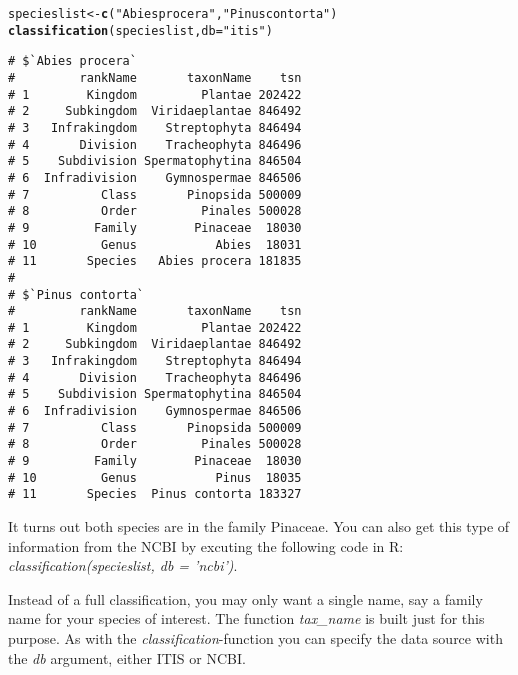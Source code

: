 \documentclass[10pt,a4paper,twocolumn]{article}\usepackage[]{graphicx}\usepackage[]{color}
\makeatletter
\newcommand{\hlstr}[1]{\textcolor[rgb]{0.192,0.494,0.8}{#1}}%
\newcommand{\hlstd}[1]{\textcolor[rgb]{0.345,0.345,0.345}{#1}}%
\newcommand{\hlkwb}[1]{\textcolor[rgb]{0.69,0.353,0.396}{#1}}%
\newcommand{\hlkwc}[1]{\textcolor[rgb]{0.333,0.667,0.333}{#1}}%
\newcommand{\hlkwd}[1]{\textcolor[rgb]{0.737,0.353,0.396}{\textbf{#1}}}%
\newenvironment{kframe}{%
 \def\at@end@of@kframe{}%
 \ifinner\ifhmode%
  \def\at@end@of@kframe{\end{minipage}}%
  \begin{minipage}{\columnwidth}%
 \fi\fi%
 \def\FrameCommand##1{\hskip\@totalleftmargin \hskip-\fboxsep
 \colorbox{shadecolor}{##1}\hskip-\fboxsep
     \hskip-\linewidth \hskip-\@totalleftmargin \hskip\columnwidth}%
 \MakeFramed {\advance\hsize-\width
   \@totalleftmargin\z@ \linewidth\hsize
   \@setminipage}}%
 {\par\unskip\endMakeFramed%
 \at@end@of@kframe}
\newenvironment{knitrout}{}{} %
\makeatother
\begin{document}
\begin{knitrout}\scriptsize
{}\color{fgcolor}\begin{kframe}
\begin{alltt}
\hlstd{specieslist} \hlkwb{<-} \hlkwd{c}\hlstd{(}\hlstr{"Abies procera"}\hlstd{,} \hlstr{"Pinus contorta"}\hlstd{)}
\hlkwd{classification}\hlstd{(specieslist,} \hlkwc{db} \hlstd{=} \hlstr{"itis"}\hlstd{)}
\end{alltt}
\begin{verbatim}
# $`Abies procera`
#         rankName       taxonName    tsn
# 1        Kingdom         Plantae 202422
# 2     Subkingdom  Viridaeplantae 846492
# 3   Infrakingdom    Streptophyta 846494
# 4       Division    Tracheophyta 846496
# 5    Subdivision Spermatophytina 846504
# 6  Infradivision    Gymnospermae 846506
# 7          Class       Pinopsida 500009
# 8          Order         Pinales 500028
# 9         Family        Pinaceae  18030
# 10         Genus           Abies  18031
# 11       Species   Abies procera 181835
# 
# $`Pinus contorta`
#         rankName       taxonName    tsn
# 1        Kingdom         Plantae 202422
# 2     Subkingdom  Viridaeplantae 846492
# 3   Infrakingdom    Streptophyta 846494
# 4       Division    Tracheophyta 846496
# 5    Subdivision Spermatophytina 846504
# 6  Infradivision    Gymnospermae 846506
# 7          Class       Pinopsida 500009
# 8          Order         Pinales 500028
# 9         Family        Pinaceae  18030
# 10         Genus           Pinus  18035
# 11       Species  Pinus contorta 183327
\end{verbatim}
\end{kframe}
\end{knitrout}



It turns out both species are in the family Pinaceae. You can also get this type of information from the NCBI by excuting the following code in R: \emph{classification(specieslist, db = 'ncbi')}.

Instead of a full classification, you may only want a single name, say a family name for your species of interest. The function \emph{tax\_name} is built just for this purpose. As with the \emph{classification}-function you can specify the data source with the \emph{db} argument, either ITIS or NCBI. 
\end{document}
